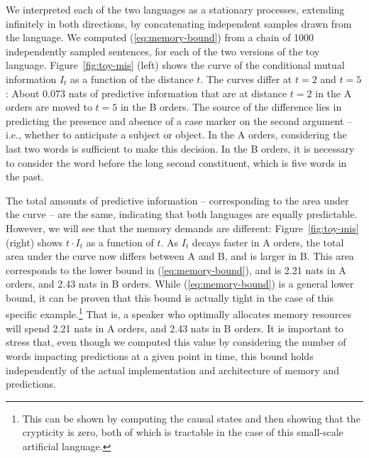 \documentclass[11pt,letterpaper]{article}
\begin{document}
We interpreted each of the two languages as a stationary processes, extending infinitely in both directions, by concatenating independent samples drawn from the language.
			We computed (\ref{eq:memory-bound}) from a chain of 1000 independently sampled sentences, for each of the two versions of the toy language.
			Figure~\ref{fig:toy-mis} (left) shows the curve of the conditional mutual information $I_t$ as a function of the distance $t$.
			The curves differ at $t=2$ and $t=5$: 
			About 0.073 nats of predictive information that are at distance $t=2$ in the A orders are moved to $t=5$ in the B orders.
			The source of the difference lies in predicting the presence and absence of a case marker on the second argument -- i.e., whether to anticipate a subject or object.
			In the A orders, considering the last two words is sufficient to make this decision.
			In the B orders, it is necessary to consider the word before the long second constituent, which is five words in the past.

			The total amounts of predictive information -- corresponding to the area under the curve -- are the same, indicating that both languages are equally predictable.
			However, we will see that the memory demands are different:
			Figure~\ref{fig:toy-mis} (right) shows $t\cdot I_t$ as a function of $t$.
			As $I_t$ decays faster in A orders, the total area under the curve now differs between A and B, and is larger in B.
			This area corresponds to the lower bound in (\ref{eq:memory-bound}), and is 2.21 nats in A orders, and 2.43 nats in B orders.
			While (\ref{eq:memory-bound}) is a general lower bound, it can be proven that this bound is actually tight in the case of this specific example.\footnote{This can be shown by computing the causal states and then showing that the crypticity is zero, both of which is tractable in the case of this small-scale artificial language.}
That is, a speaker who optimally allocates memory resources will spend 2.21 nats in A orders, and 2.43 nats in B orders.
It is important to stress that, even though we computed this value by considering the number of words impacting predictions at a given point in time, this bound holds independently of the actual implementation and architecture of memory and predictions.
\end{document}
